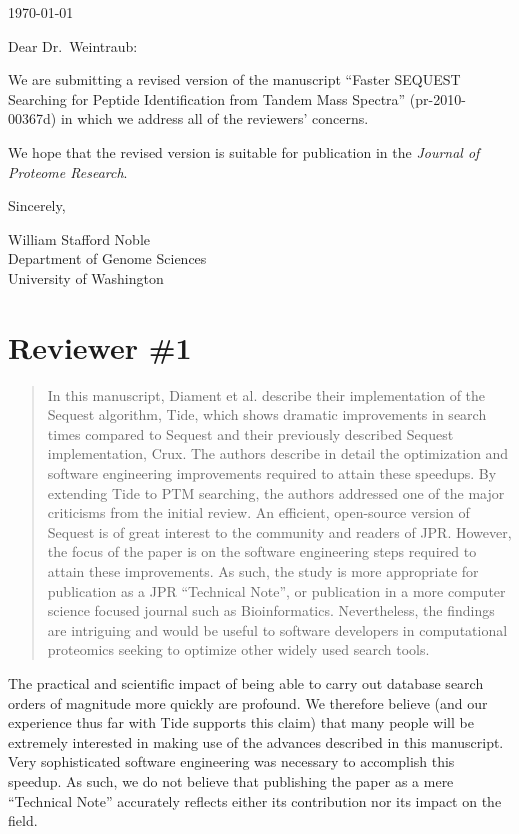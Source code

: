 \documentclass{article}
\newcommand{\breview}{\begin{quotation}\begin{em}\noindent}
\newcommand{\ereview}{\end{em}\end{quotation}}
\begin{document}
\hspace*{3.0in}\today

\vspace*{3ex}

\noindent
Dear Dr.\ Weintraub:

\vspace*{1ex}

We are submitting a revised version of the manuscript ``Faster SEQUEST
Searching for Peptide Identification from Tandem Mass Spectra''
(pr-2010-00367d) in which we address all of the reviewers' concerns.


We hope that the revised version is suitable for publication
in the {\em Journal of Proteome Research}.

\vspace*{1ex}

\noindent
Sincerely,

\hspace*{1ex}

\noindent
William Stafford Noble\\
Department of Genome Sciences\\
University of Washington

\clearpage
\section*{Reviewer \#1}

\breview In this manuscript, Diament et al. describe their
implementation of the Sequest algorithm, Tide, which shows dramatic
improvements in search times compared to Sequest and their previously
described Sequest implementation, Crux. The authors describe in detail
the optimization and software engineering improvements required to
attain these speedups. By extending Tide to PTM searching, the authors
addressed one of the major criticisms from the initial review. An
efficient, open-source version of Sequest is of great interest to the
community and readers of JPR. However, the focus of the paper is on
the software engineering steps required to attain these
improvements. As such, the study is more appropriate for publication
as a JPR ``Technical Note'', or publication in a more computer science
focused journal such as Bioinformatics. Nevertheless, the findings are
intriguing and would be useful to software developers in computational
proteomics seeking to optimize other widely used search tools.
\ereview

The practical and scientific impact of being able to carry out
database search orders of magnitude more quickly are profound.  We
therefore believe (and our experience thus far with Tide supports this
claim) that many people will be extremely interested in making use of
the advances described in this manuscript.  Very sophisticated
software engineering was necessary to accomplish this speedup.  As
such, we do not believe that publishing the paper as a mere
``Technical Note'' accurately reflects either its contribution nor its
impact on the field.
\end{document}
